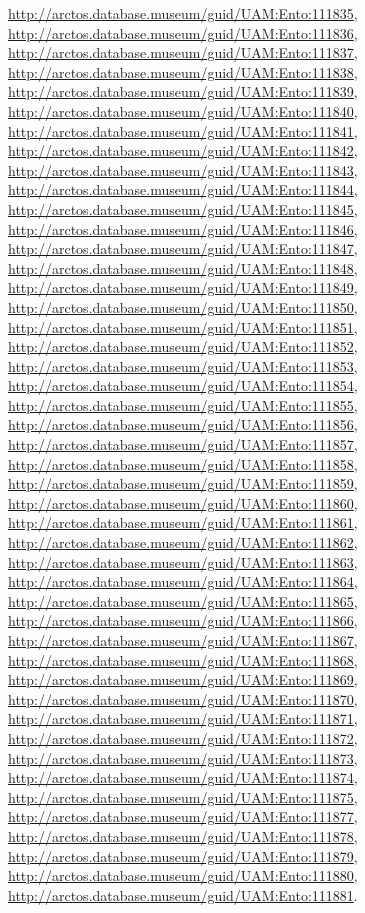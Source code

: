 \documentclass[9pt, article]{memoir}
\begin{document}
\begin{multicols}{2}
\url{http://arctos.database.museum/guid/UAM:Ento:111835}, 
\url{http://arctos.database.museum/guid/UAM:Ento:111836}, 
\url{http://arctos.database.museum/guid/UAM:Ento:111837}, 
\url{http://arctos.database.museum/guid/UAM:Ento:111838}, 
\url{http://arctos.database.museum/guid/UAM:Ento:111839}, 
\url{http://arctos.database.museum/guid/UAM:Ento:111840}, 
\url{http://arctos.database.museum/guid/UAM:Ento:111841}, 
\url{http://arctos.database.museum/guid/UAM:Ento:111842}, 
\url{http://arctos.database.museum/guid/UAM:Ento:111843}, 
\url{http://arctos.database.museum/guid/UAM:Ento:111844}, 
\url{http://arctos.database.museum/guid/UAM:Ento:111845}, 
\url{http://arctos.database.museum/guid/UAM:Ento:111846}, 
\url{http://arctos.database.museum/guid/UAM:Ento:111847}, 
\url{http://arctos.database.museum/guid/UAM:Ento:111848}, 
\url{http://arctos.database.museum/guid/UAM:Ento:111849}, 
\url{http://arctos.database.museum/guid/UAM:Ento:111850}, 
\url{http://arctos.database.museum/guid/UAM:Ento:111851}, 
\url{http://arctos.database.museum/guid/UAM:Ento:111852}, 
\url{http://arctos.database.museum/guid/UAM:Ento:111853}, 
\url{http://arctos.database.museum/guid/UAM:Ento:111854}, 
\url{http://arctos.database.museum/guid/UAM:Ento:111855}, 
\url{http://arctos.database.museum/guid/UAM:Ento:111856}, 
\url{http://arctos.database.museum/guid/UAM:Ento:111857}, 
\url{http://arctos.database.museum/guid/UAM:Ento:111858}, 
\url{http://arctos.database.museum/guid/UAM:Ento:111859}, 
\url{http://arctos.database.museum/guid/UAM:Ento:111860}, 
\url{http://arctos.database.museum/guid/UAM:Ento:111861}, 
\url{http://arctos.database.museum/guid/UAM:Ento:111862}, 
\url{http://arctos.database.museum/guid/UAM:Ento:111863}, 
\url{http://arctos.database.museum/guid/UAM:Ento:111864}, 
\url{http://arctos.database.museum/guid/UAM:Ento:111865}, 
\url{http://arctos.database.museum/guid/UAM:Ento:111866}, 
\url{http://arctos.database.museum/guid/UAM:Ento:111867}, 
\url{http://arctos.database.museum/guid/UAM:Ento:111868}, 
\url{http://arctos.database.museum/guid/UAM:Ento:111869}, 
\url{http://arctos.database.museum/guid/UAM:Ento:111870}, 
\url{http://arctos.database.museum/guid/UAM:Ento:111871}, 
\url{http://arctos.database.museum/guid/UAM:Ento:111872}, 
\url{http://arctos.database.museum/guid/UAM:Ento:111873}, 
\url{http://arctos.database.museum/guid/UAM:Ento:111874}, 
\url{http://arctos.database.museum/guid/UAM:Ento:111875}, 
\url{http://arctos.database.museum/guid/UAM:Ento:111877}, 
\url{http://arctos.database.museum/guid/UAM:Ento:111878}, 
\url{http://arctos.database.museum/guid/UAM:Ento:111879}, 
\url{http://arctos.database.museum/guid/UAM:Ento:111880}, 
\url{http://arctos.database.museum/guid/UAM:Ento:111881}.


\end{multicols}
\end{document}
